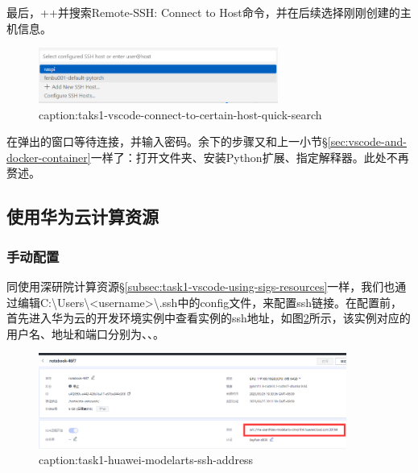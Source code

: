 最后，++并搜索Remote-SSH: Connect to Host命令，并在后续选择刚刚创建的主机信息。

\begin{figure}[htbp]
	\centering
	\includegraphics[width=0.7\textwidth]{figures/taks1-vscode-connect-to-certain-host-quick-search.png}
	\caption{caption:taks1-vscode-connect-to-certain-host-quick-search}
	\label{fig:taks1-vscode-connect-to-certain-host-quick-search}
\end{figure}

在弹出的窗口等待连接，并输入密码。余下的步骤又和上一小节\S\ref{sec:vscode-and-docker-container}一样了：打开文件夹、安装Python扩展、指定解释器。此处不再赘述。

\subsection{使用华为云计算资源}

\subsubsection{手动配置}

同使用深研院计算资源\S\ref{subsec:task1-vscode-using-sigs-resources}一样，我们也通过编辑C:\textbackslash Users\textbackslash <username>\textbackslash .ssh中的config文件，来配置ssh链接。在配置前，首先进入华为云的开发环境实例中查看实例的ssh地址，如图\ref{fig:task1-huawei-modelarts-ssh-address}所示，该实例对应的用户名、地址和端口分别为、、。

\begin{figure}[htbp]
	\centering
	\includegraphics[width=0.9\textwidth]{figures/task1-huawei-modelarts-ssh-address.png}
	\caption{caption:task1-huawei-modelarts-ssh-address}
	\label{fig:task1-huawei-modelarts-ssh-address}
\end{figure}



